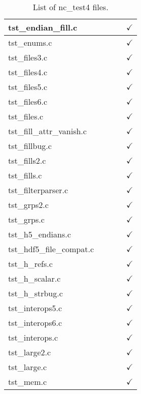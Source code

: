 \begin{table}[H]
\begin{tabular}{|l|c|c|c|c|}
tst\_endian\_fill.c   &  &   &   & $\checkmark$    \\ \hline
tst\_enums.c   &  &   &   & $\checkmark$    \\ \hline
tst\_files3.c   &  &   &   & $\checkmark$    \\ \hline
tst\_files4.c   &  &   &   & $\checkmark$    \\ \hline
tst\_files5.c   &  &   &   & $\checkmark$    \\ \hline
tst\_files6.c   &  &   &   & $\checkmark$    \\ \hline
tst\_files.c   &  &   &   & $\checkmark$    \\ \hline
tst\_fill\_attr\_vanish.c   &  &   &   & $\checkmark$    \\ \hline
tst\_fillbug.c   &  &   &   & $\checkmark$    \\ \hline
tst\_fills2.c   &  &   &   & $\checkmark$    \\ \hline
tst\_fills.c   &  &   &   & $\checkmark$    \\ \hline
tst\_filterparser.c   &  &   &   & $\checkmark$    \\ \hline
tst\_grps2.c   &  &   &   & $\checkmark$    \\ \hline
tst\_grps.c   &  &   &   & $\checkmark$    \\ \hline
tst\_h5\_endians.c   &  &   &   & $\checkmark$    \\ \hline
tst\_hdf5\_file\_compat.c   &  &   &   & $\checkmark$    \\ \hline
tst\_h\_refs.c   &  &   &   & $\checkmark$    \\ \hline
tst\_h\_scalar.c   &  &   &   & $\checkmark$    \\ \hline
tst\_h\_strbug.c   &  &   &   & $\checkmark$    \\ \hline
tst\_interops5.c   &  &   &   & $\checkmark$    \\ \hline
tst\_interops6.c   &  &   &   & $\checkmark$    \\ \hline
tst\_interops.c   &  &   &   & $\checkmark$    \\ \hline
tst\_large2.c   &  &   &   & $\checkmark$    \\ \hline
tst\_large.c   &  &   &   & $\checkmark$    \\ \hline
tst\_mem.c   &  &   &   & $\checkmark$    \\ \hline
\end{tabular}
\caption{List of nc\_test4 files.}
\end{table}

